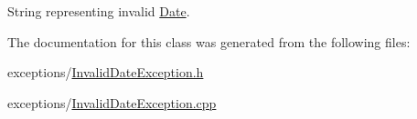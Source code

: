 String representing invalid \mbox{\hyperlink{classDate}{Date}}. 



The documentation for this class was generated from the following files\+:\begin{DoxyCompactItemize}
\item 
exceptions/\mbox{\hyperlink{InvalidDateException_8h}{Invalid\+Date\+Exception.\+h}}\item 
exceptions/\mbox{\hyperlink{InvalidDateException_8cpp}{Invalid\+Date\+Exception.\+cpp}}\end{DoxyCompactItemize}
